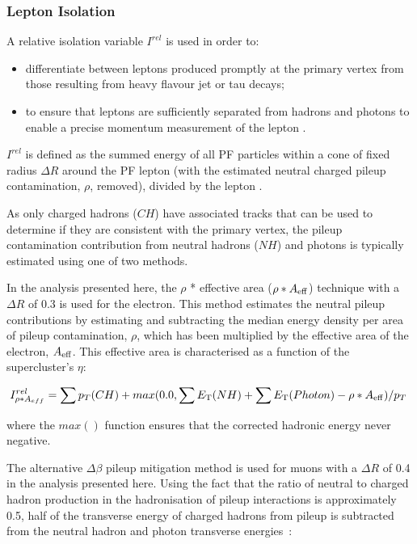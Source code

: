 \subsubsection{Lepton Isolation}\label{subsubsec:relIso}
A relative isolation variable $I^{rel}$ is used in order to:
\begin{itemize}
\item differentiate between leptons produced promptly at the primary vertex from those resulting from heavy flavour jet or tau decays;
\item to ensure that leptons are sufficiently separated from hadrons and photons to enable a precise momentum measurement of the lepton .
\end{itemize}

$I^{rel}$ is defined as the summed energy of all PF particles within a cone of fixed radius $\Delta R$ around the PF lepton (with the estimated neutral charged pileup contamination, $\rho$, removed), divided by the lepton \pT.

As only charged hadrons ($CH$) have associated tracks that can be used to determine if they are consistent with the primary vertex, the pileup contamination contribution from neutral hadrons ($NH$) and photons is typically estimated using one of two methods.

In the analysis presented here,  the $\rho$ * effective area ($\rho * A_{\rm eff}$) technique with a $\Delta R$ of 0.3 is used for the electron.
This method estimates the neutral pileup contributions by estimating and subtracting the median energy density per area of pileup contamination, $\rho$, which has been multiplied by the effective area of the electron, $A_{\rm eff}$.
This effective area is characterised as a function of the supercluster's $\eta$:

\begin{equation}
I^{rel}_{\rho * A_{eff}} = \sum p_T(CH) + max (0.0, \sum E_{\rm T}(NH) + \sum E_{\rm T}(Photon) -\rho*A_{\rm eff} )/p_T \;
\end{equation}\label{eq:rhoEffA}

where the $max()$ function ensures that the corrected hadronic energy never negative.

The alternative $\Delta\beta$ pileup mitigation method is used for muons with a $\Delta R$ of 0.4 in the analysis presented here.
Using the fact that the ratio of neutral to charged hadron production in the hadronisation of pileup interactions is approximately 0.5, half of the transverse energy of charged hadrons from pileup is subtracted from the neutral hadron and photon transverse energies~\cite{Chatrchyan:2012vp}:

